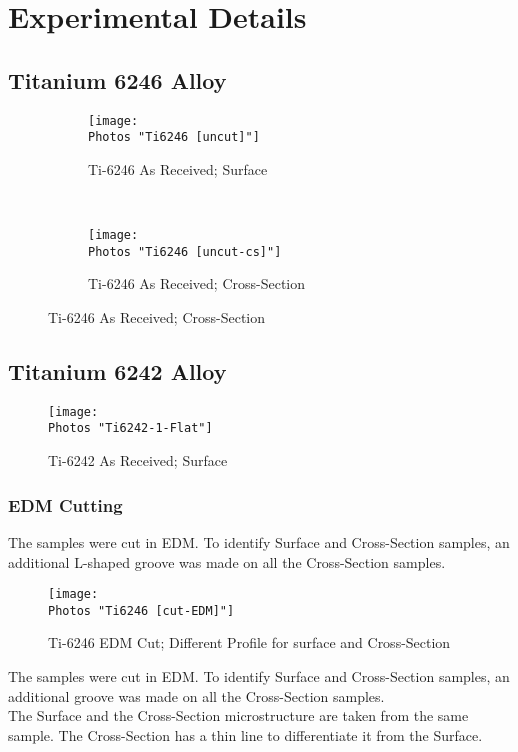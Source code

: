 \chapter{Experimental Details}
\section{Titanium 6246 Alloy} 

\begin{figure}[H]
    \centering
    \begin{subfigure}{0.40\textwidth}
        \texttt{[image: \\Photos "Ti6246 [uncut]"]}
        \caption{Ti-6246 As Received; Surface}
        \label{fig:2a}
    \end{subfigure}
    ~
    \begin{subfigure}{0.40\textwidth}
        \texttt{[image: \\Photos "Ti6246 [uncut-cs]"]}
        \caption{Ti-6246 As Received; Cross-Section}
        \label{fig:2b}
    \end{subfigure}
    \label{fig:As-Received}
\end{figure}

\section{Titanium 6242 Alloy} 

\begin{figure}[H]
    \centering
        \texttt{[image: \\Photos "Ti6242-1-Flat"]}
        \caption{Ti-6242 As Received; Surface}
    \label{fig:EDM-Cut}
\end{figure}


\subsection{EDM Cutting}
The samples were cut in EDM. To identify Surface and Cross-Section samples, an additional L-shaped groove was made on all the Cross-Section samples. 

\begin{figure}[H]
    \centering
        \texttt{[image: \\Photos "Ti6246 [cut-EDM]"]}
        \caption{Ti-6246 EDM Cut; Different Profile for surface and Cross-Section}
    \label{fig:EDM-Cut}
\end{figure}

The samples were cut in EDM. To identify Surface and Cross-Section samples, an additional groove was made on all the Cross-Section samples. 
\\
The Surface and the Cross-Section microstructure are taken from the same sample. The Cross-Section has a thin line to differentiate it from the Surface.


